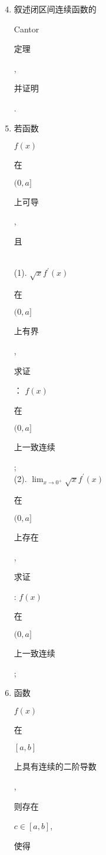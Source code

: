\documentclass[10pt]{article}
\begin{document}
\begin{enumerate}
  \setcounter{enumi}{3}
  \item \begin{CJK}{UTF8}{mj}叙述闭区间连续函数的\end{CJK} Cantor \begin{CJK}{UTF8}{mj}定理\end{CJK}, \begin{CJK}{UTF8}{mj}并证明\end{CJK}.

  \item \begin{CJK}{UTF8}{mj}若函数\end{CJK} $f(x)$ \begin{CJK}{UTF8}{mj}在\end{CJK} $(0, a]$ \begin{CJK}{UTF8}{mj}上可导\end{CJK}, \begin{CJK}{UTF8}{mj}且\end{CJK}\\
(1). $\sqrt{x} f^{\prime}(x)$ \begin{CJK}{UTF8}{mj}在\end{CJK} $(0, a]$ \begin{CJK}{UTF8}{mj}上有界\end{CJK}, \begin{CJK}{UTF8}{mj}求证\end{CJK}： $f(x)$ \begin{CJK}{UTF8}{mj}在\end{CJK} $(0, a]$ \begin{CJK}{UTF8}{mj}上一致连续\end{CJK};\\
(2). $\lim _{x \rightarrow 0^{+}} \sqrt{x} f^{\prime}(x)$ \begin{CJK}{UTF8}{mj}在\end{CJK} $(0, a]$ \begin{CJK}{UTF8}{mj}上存在\end{CJK}, \begin{CJK}{UTF8}{mj}求证\end{CJK}: $f(x)$ \begin{CJK}{UTF8}{mj}在\end{CJK} $(0, a]$ \begin{CJK}{UTF8}{mj}上一致连续\end{CJK};

  \item \begin{CJK}{UTF8}{mj}函数\end{CJK} $f(x)$ \begin{CJK}{UTF8}{mj}在\end{CJK} $[a, b]$ \begin{CJK}{UTF8}{mj}上具有连续的二阶导数\end{CJK}, \begin{CJK}{UTF8}{mj}则存在\end{CJK} $c \in[a, b]$, \begin{CJK}{UTF8}{mj}使得\end{CJK}

\end{enumerate}
\end{document}
